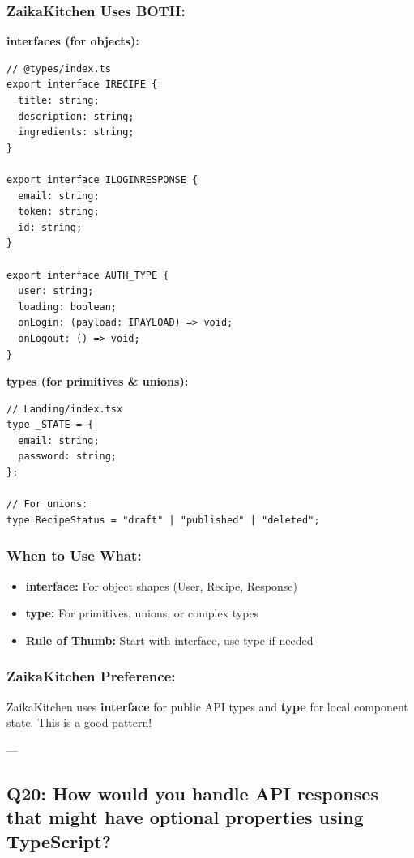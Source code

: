 \documentclass[12pt]{article}
\begin{document}
\subsubsection*{ZaikaKitchen Uses BOTH:}

\textbf{interfaces (for objects):}

\begin{lstlisting}
// @types/index.ts
export interface IRECIPE {
  title: string;
  description: string;
  ingredients: string;
}

export interface ILOGINRESPONSE {
  email: string;
  token: string;
  id: string;
}

export interface AUTH_TYPE {
  user: string;
  loading: boolean;
  onLogin: (payload: IPAYLOAD) => void;
  onLogout: () => void;
}
\end{lstlisting}

\textbf{types (for primitives \& unions):}

\begin{lstlisting}
// Landing/index.tsx
type _STATE = {
  email: string;
  password: string;
};

// For unions:
type RecipeStatus = "draft" | "published" | "deleted";
\end{lstlisting}

\subsubsection*{When to Use What:}

\begin{itemize}
    \item \textbf{interface:} For object shapes (User, Recipe, Response)
    \item \textbf{type:} For primitives, unions, or complex types
    \item \textbf{Rule of Thumb:} Start with interface, use type if needed
\end{itemize}

\subsubsection*{ZaikaKitchen Preference:}

ZaikaKitchen uses \textbf{interface} for public API types and \textbf{type} for local component state. This is a good pattern!

---

\subsection{Q20: How would you handle API responses that might have optional properties using TypeScript?}
\end{document}
